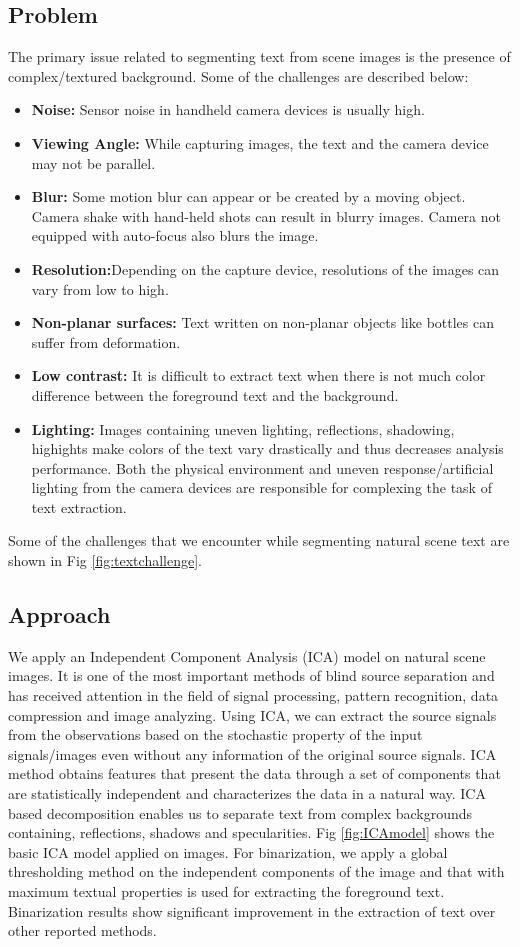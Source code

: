 \subsection{Problem}
The primary issue related to segmenting text from scene images is the presence of complex/textured background. 
Some of the challenges are described below:
\begin{itemize}
\item \textbf{Noise:} Sensor noise in handheld camera devices is usually high.
\item \textbf{Viewing Angle:} While capturing images, the text and the camera device may not be parallel.
\item \textbf{Blur:} Some motion blur can
appear or be created by a moving object. Camera shake with hand-held shots can result in blurry images.
Camera not equipped with auto-focus also blurs the image.
\item \textbf{Resolution:}Depending on the capture device, resolutions of the images can vary from low to high.
\item \textbf{Non-planar surfaces:} Text written on non-planar objects like bottles can suffer from deformation.
\item \textbf{Low contrast:} It is difficult
to extract text when there is not much color difference between the foreground text and the background.
 \item \textbf{Lighting:}
Images containing uneven lighting, reflections, shadowing, highights make colors of the text vary drastically and thus 
decreases analysis performance.
Both the physical environment and uneven response/artificial lighting from the camera devices are responsible for 
complexing the task of text extraction.
\end{itemize}
Some of the challenges that we encounter while segmenting natural scene text are shown in 
Fig \ref{fig:textchallenge}.

\subsection{Approach}
We apply an Independent Component Analysis (ICA) model on natural scene images.
It is one of the most important methods of blind source separation and has received  
attention in the field of signal processing, pattern recognition, data compression and image analyzing.
Using ICA,  we can extract the source signals from the 
observations based on the stochastic property of the input signals/images
even without any information of the original source signals.  
ICA method obtains features that present the data through a set of 
components that are statistically independent and characterizes the data 
in a natural way. 
ICA based decomposition enables us to separate text from complex backgrounds containing, reflections,
shadows and specularities. Fig \ref{fig:ICAmodel} shows the basic ICA model applied on images.
For binarization, we apply a global thresholding method on the independent components of the image
and that with maximum textual properties is used for extracting the foreground text. Binarization results show 
significant improvement in the extraction of text over other reported methods. 




